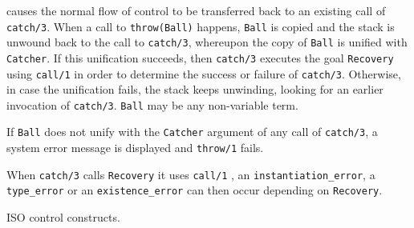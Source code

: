  causes the normal flow of control to be transferred
back to an existing call of \texttt{catch/3}. When a call to
\texttt{throw(Ball)} happens, \texttt{Ball} is copied and the stack is
unwound back to the call to \texttt{catch/3}, whereupon the copy of
\texttt{Ball} is unified with \texttt{Catcher}. If this unification
succeeds, then \texttt{catch/3} executes the goal \texttt{Recovery} using
\texttt{call/1}  in order to determine the success or
failure of \texttt{catch/3}. Otherwise, in case the unification fails,
the stack keeps unwinding, looking for an earlier invocation of
\texttt{catch/3}. \texttt{Ball} may be any non-variable term.

\begin{PlErrors}





\end{PlErrors}

If \texttt{Ball} does not unify with the \texttt{Catcher} argument of
any call of \texttt{catch/3}, a system error message is displayed and
\texttt{throw/1} fails.

When \texttt{catch/3} calls \texttt{Recovery} it uses \texttt{call/1}
, an \texttt{instantiation\_error}, a \texttt{type\_error}
or an \texttt{existence\_error} can then occur depending on
\texttt{Recovery}. 

\Portability

ISO control constructs.


